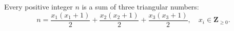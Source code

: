 Every positive integer $n$ is a sum of three triangular numbers:
$$
n = \frac{x_1(x_1+1)}{2} + \frac{x_2(x_2+1)}{2} + \frac{x_3(x_3+1)}{2}, \quad x_i \in \mathbf{Z}_{\geq 0}.
$$
